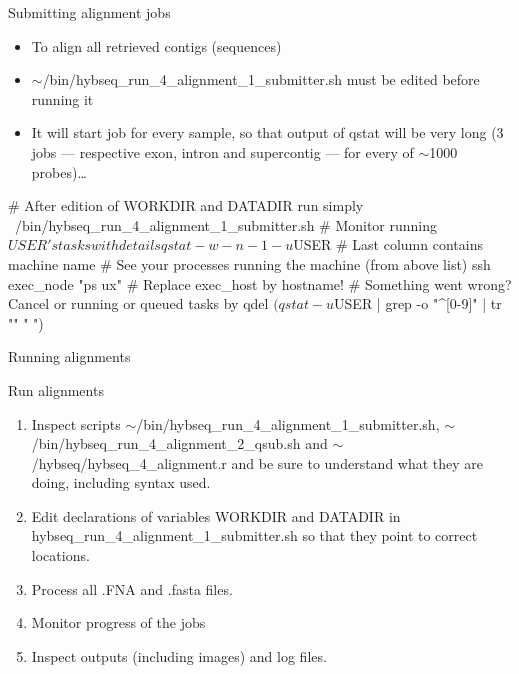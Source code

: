 \documentclass[compress, ucs, xelatex, 11pt, xcolor=x11names, aspectratio=169,
	hyperref={
		bookmarks=true,
		unicode=true,
		colorlinks=true,
		pdftitle={HybSeq course},
		plainpages=false,
		pdfauthor={Vojtech Zeisek},
		pdfsubject={Practical processing of HybSeq target enrichment sequencing data on computing grids like MetaCentrum},
		pdfcreator={XeLaTeX},
		pdfkeywords={BASH, command line, GNU, HybSeq, Linux, MetaCentrum, sequencing shell, target enrichment},
		linkcolor=Turquoise4, %
		anchorcolor=DodgerBlue4, %
		citecolor=DodgerBlue4, %
		filecolor=DodgerBlue4, %
		menucolor=Tan4, %
		urlcolor=DarkOliveGreen4, %
		pdftex},
	url={hyphens, lowtilde} %
	]{beamer}
\renewcommand{\texttt}[1]{\colorbox{Cornsilk2}{{\ttfamily #1}}}
\renewcommand{\alert}[1]{\textcolor{OrangeRed3}{#1}}
\begin{document}
\begin{frame}[fragile]{Submitting alignment jobs}
	\begin{itemize}
		\item To align all retrieved contigs (sequences)
		\item \alert{\texttt{$\sim$/bin/hybseq\_run\_4\_alignment\_1\_submitter.sh} must be edited before running it}
		\item It will start job for every sample, so that output of \texttt{qstat} will be very long (3 jobs --- respective exon, intron and supercontig --- for every of $\sim$1000 probes)\ldots
	\end{itemize}
	\begin{bashcode}
    # After edition of WORKDIR and DATADIR run simply
    ~/bin/hybseq_run_4_alignment_1_submitter.sh
    # Monitor running $USER's tasks with details
    qstat -w -n -1 -u $USER # Last column contains machine name
    # See your processes running the machine (from above list)
    ssh exec_node "ps ux" # Replace exec_host by hostname!
    # Something went wrong? Cancel or running or queued tasks by
    qdel $(qstat -u $USER | grep -o "^[0-9]\+" | tr "\n" " ")
	\end{bashcode}
\end{frame}

\begin{frame}{Running alignments}
	\begin{exampleblock}{Run alignments}
		\begin{enumerate}
			\item Inspect scripts \texttt{$\sim$/bin/hybseq\_run\_4\_alignment\_1\_submitter.sh}, \texttt{$\sim$/bin/hybseq\_run\_4\_alignment\_2\_qsub.sh} and \texttt{$\sim$/hybseq/hybseq\_4\_alignment.r} and be sure to understand what they are doing, including syntax used.
			\item Edit declarations of variables \texttt{WORKDIR} and \texttt{DATADIR} in \texttt{hybseq\_run\_4\_alignment\_1\_submitter.sh} so that they point to correct locations.
			\item Process all \texttt{*.FNA} and \texttt{*.fasta} files.
			\item Monitor progress of the jobs
			\item Inspect outputs (including images) and log files.
		\end{enumerate}
	\end{exampleblock}
\end{frame}
\end{document}
